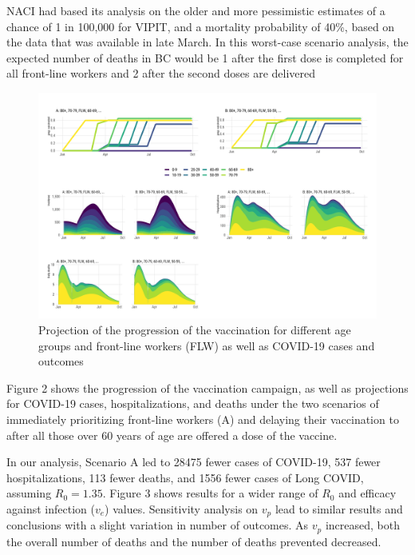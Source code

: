 \documentclass[]{interact}
\theoremstyle{plain}%
\theoremstyle{definition}
\theoremstyle{remark}
\begin{document}
NACI had based its analysis on the older and more pessimistic estimates
of a chance of 1 in 100,000 for VIPIT, and a mortality probability of
40\%, based on the data that was available in late March. In this
worst-case scenario analysis, the expected number of deaths in BC would
be 1 after the first dose is completed for all front-line workers and 2
after the second doses are delivered

\begin{figure}

{\centering \includegraphics[width=1\linewidth]{../figures/fig-trajectoriesFull} 

}

\caption{Projection of the progression of the vaccination for different age groups and front-line workers (FLW) as well as COVID-19 cases and outcomes}\label{fig:fig1}
\end{figure}

Figure 2 shows the progression of the vaccination campaign, as well as
projections for COVID-19 cases, hospitalizations, and deaths under the
two scenarios of immediately prioritizing front-line workers (A) and
delaying their vaccination to after all those over 60 years of age are
offered a dose of the vaccine.

In our analysis, Scenario A led to 28475 fewer cases of COVID-19, 537
fewer hospitalizations, 113 fewer deaths, and 1556 fewer cases of Long
COVID, assuming \(R_0=1.35\). Figure 3 shows results for a wider range
of \(R_0\) and efficacy against infection (\(v_e\)) values. Sensitivity
analysis on \(v_p\) lead to similar results and conclusions with a
slight variation in number of outcomes. As \(v_p\) increased, both the
overall number of deaths and the number of deaths prevented decreased.
\end{document}
